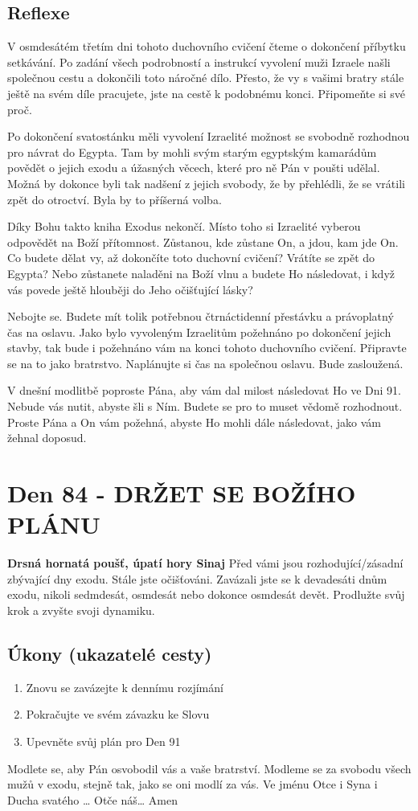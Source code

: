 \documentclass[11pt]{article}
\newcommand{\zacatekDvanactyTyden}{
\textbf{Drsná hornatá poušť, úpatí hory Sinaj} \newline 
Před vámi jsou rozhodující/zásadní zbývající dny exodu. Stále jste očišťováni. Zavázali jste se k devadesáti dnům exodu, nikoli sedmdesát, osmdesát nebo dokonce osmdesát devět. Prodlužte svůj krok a zvyšte svoji dynamiku.

\subsection*{Úkony (ukazatelé cesty)}
\begin{enumerate}
  \item Znovu se zavázejte k dennímu rozjímání
  \item Pokračujte ve svém závazku ke Slovu
  \item Upevněte svůj plán pro Den 91
\end{enumerate}
Modlete se, aby Pán osvobodil vás a vaše bratrství. \newline
Modleme se za svobodu všech mužů v exodu, stejně tak, jako se oni modlí za vás.\newline
Ve jménu Otce i Syna i Ducha svatého …  Otče náš… Amen
}
\begin{document}
\subsection*{Reflexe}
V osmdesátém třetím dni tohoto duchovního cvičení čteme o dokončení příbytku setkávání. Po zadání všech podrobností a
instrukcí vyvolení muži Izraele našli společnou cestu a dokončili toto náročné dílo. Přesto, že vy s vašimi bratry stále ještě na svém
díle pracujete, jste na cestě k podobnému konci. Připomeňte si své proč.

Po dokončení svatostánku měli vyvolení Izraelité možnost se svobodně rozhodnou pro návrat do Egypta. Tam by mohli svým
starým egyptským kamarádům povědět o jejich exodu a úžasných věcech, které pro ně Pán v poušti udělal. Možná by dokonce byli
tak nadšení z jejich svobody, že by přehlédli, že se vrátili zpět do otroctví. Byla by to příšerná volba.

Díky Bohu takto kniha Exodus nekončí. Místo toho si Izraelité vyberou odpovědět na Boží přítomnost. Zůstanou, kde zůstane On,
a jdou, kam jde On. Co budete dělat vy, až dokončíte toto duchovní cvičení? Vrátíte se zpět do Egypta? Nebo zůstanete naladěni na
Boží vlnu a budete Ho následovat, i když vás povede ještě hlouběji do Jeho očišťující lásky?

Nebojte se. Budete mít tolik potřebnou čtrnáctidenní přestávku a právoplatný čas na oslavu. Jako bylo vyvoleným Izraelitům
požehnáno po dokončení jejich stavby, tak bude i požehnáno vám na konci tohoto duchovního cvičení. Připravte se na to jako
bratrstvo. Naplánujte si čas na společnou oslavu. Bude zasloužená.

V dnešní modlitbě poproste Pána, aby vám dal milost následovat Ho ve Dni 91. Nebude vás nutit, abyste šli s Ním. Budete se pro
to muset vědomě rozhodnout. Proste Pána a On vám požehná, abyste Ho mohli dále následovat, jako vám žehnal doposud.


\newpage
\section{Den 84 - DRŽET SE BOŽÍHO PLÁNU}
\zacatekDvanactyTyden
\end{document}
